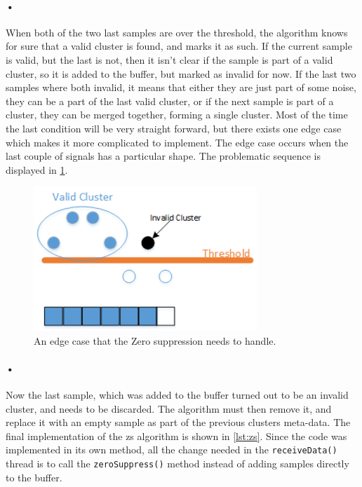 \documentclass[a4paper, 12pt]{report}
\newcommand{\codeword}[1]{\texttt{#1}}
\begin{document}
\paragraph{•}
When both of the two last samples are over the threshold, the algorithm knows for sure that a valid cluster is found, and marks it as such.
If the current sample is valid, but the last is not, then it isn't clear if the sample is part of a valid cluster, so it is added to the buffer, but marked as invalid for now.
If the last two samples where both invalid, it means that either they are just part of some noise, they can be a part of the last valid cluster, or if the next sample is part of a cluster, they can be merged together, forming a single cluster.
Most of the time the last condition will be very straight forward, but there exists one edge case which makes it more complicated to implement.
The edge case occurs when the last couple of signals has a particular shape.
The problematic sequence is displayed in \ref{fig:zs-prob}.

\begin{figure}[h!]
	\centering
		\includegraphics[width=0.75\textwidth]{images/zs-prob.png}
		\caption{An edge case that the Zero suppression needs to handle.}
		\label{fig:zs-prob}
\end{figure}

\paragraph{•}
Now the last sample, which was added to the buffer turned out to be an invalid cluster, and needs to be discarded.
The algorithm must then remove it, and replace it with an empty sample as part of the previous clusters meta-data.
The final implementation of the \gls{zs} algorithm is shown in \ref{lst:zs}.
Since the code was implemented in its own method, all the change needed in the \codeword{receiveData()} thread is to call the \codeword{zeroSuppress()} method instead of adding samples directly to the buffer.
\end{document}
